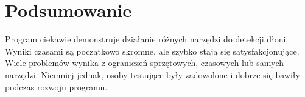 \documentclass{article}
\begin{document}
\section{Podsumowanie}
Program ciekawie demonstruje działanie różnych narzędzi do detekcji dłoni. Wyniki czasami są początkowo skromne, ale szybko stają się satysfakcjonujące. Wiele problemów wynika z ograniczeń sprzętowych, czasowych lub samych narzędzi. Niemniej jednak, osoby testujące były zadowolone i dobrze się bawiły podczas rozwoju programu.
\end{document}
